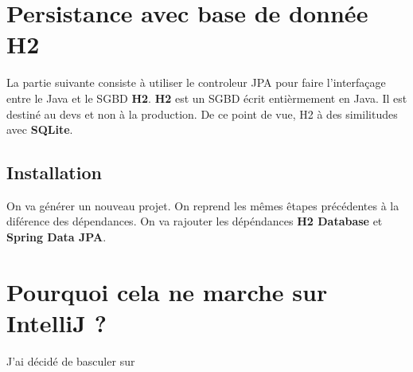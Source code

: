 \documentclass{rapport}
\begin{document}
\section{Persistance avec base de donnée H2}

La partie suivante consiste à utiliser le controleur JPA pour faire l'interfaçage entre le Java et le SGBD \textbf{H2}. \textbf{H2} est un SGBD écrit entièrmement en Java. Il est destiné au devs et non à la production. De ce point de vue, H2 à des similitudes avec \textbf{SQLite}.

\subsection{Installation}

On va générer un nouveau projet. On reprend les mêmes êtapes précédentes à la diférence des dépendances. On va rajouter les dépéndances \textbf{H2 Database} et \textbf{Spring Data JPA}.

\section{Pourquoi cela ne marche sur IntelliJ ?}

J'ai décidé de basculer sur 
\end{document}
